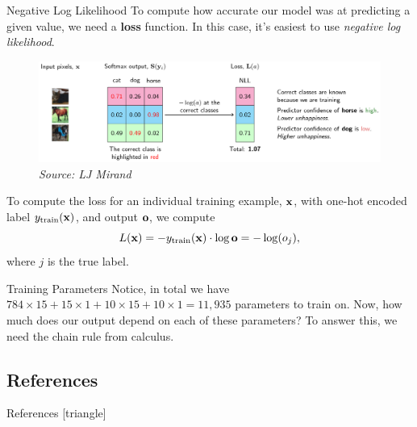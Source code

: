 \documentclass[xcolor=dvipsnames, fontsize=11pt, %
pagesize, %
parskip=half-, t]{beamer}
\begin{document}
 \begin{frame}{Negative Log Likelihood}
 To compute how accurate our model was at predicting a given value, we need a \textbf{loss} function. In this case, it's easiest to use \textit{negative log likelihood}. 
 \begin{figure}[H] \center \includegraphics[scale=0.15]{neg_log_demo.png}
 \caption{\textit{Source: LJ Mirand}} \end{figure}
To compute the loss for an individual training example, $\bold{x}$, with one-hot encoded label $y_{\text{train}}(\bold{x})$, and output $\bold{o}$, we compute $$L(\bold{x})=-y_{\text{train}}(\bold{x})\cdot \log \bold{o}=-\log(o_j),$$ where $j$ is the true label.
 \end{frame}
  \begin{frame}{Training Parameters} 
  Notice, in total we have $784\times 15+15\times 1+10\times 15+10\times 1=11,935$ parameters to train on. \pause Now, how much does our output depend on each of these parameters? \pause To answer this, we need the chain rule from calculus.
  \end{frame}

\subsection{References}
\begin{frame}[c]{References}
[triangle]

\href{http://neuralnetworksanddeeplearning.com/chap1.html}{} \smallskip

\href{https://towardsdatascience.com/a-beginners-guide-to-neural-networks-part-two-bd503514c71a}{} \smallskip

\href{http://scs.ryerson.ca/~aharley/vis/fc/}{} \smallskip

\href{https://ljvmiranda921.github.io/notebook/2017/08/13/softmax-and-the-negative-log-likelihood/}{} \smallskip


\end{frame}
\end{document}
